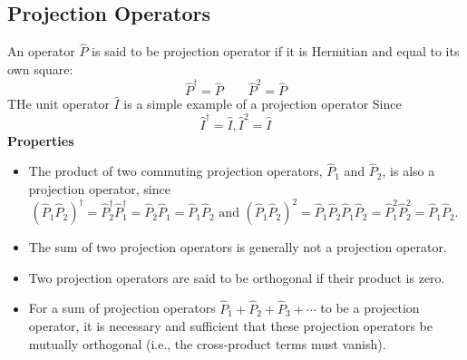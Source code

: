 \subsection{Projection Operators}
An operator $\hat{P}$ is said to be projection operator if it is Hermitian and equal to its own square:\\
$$\hat{P}^{\dagger}=\hat{P} \quad \quad \hat{P}^2=\hat{P}$$
THe unit operator $\hat{I}$ is a simple example of a projection operator Since $$\hat{I}^{\dagger}=\hat{I}, \hat{I}^2=\hat{I}$$
\textbf{Properties}\\
\begin{itemize}
	\item The product of two commuting projection operators, $\hat{P}_{1}$ and $\hat{P}_{2}$, is also a projection operator, since
	$$
	\left(\hat{P}_{1} \hat{P}_{2}\right)^{\dagger}=\hat{P}_{2}^{\dagger} \hat{P}_{1}^{\dagger}=\hat{P}_{2} \hat{P}_{1}=\hat{P}_{1} \hat{P}_{2} \text { and }\left(\hat{P}_{1} \hat{P}_{2}\right)^{2}=\hat{P}_{1} \hat{P}_{2} \hat{P}_{1} \hat{P}_{2}=\hat{P}_{1}^{2} \hat{P}_{2}^{2}=\hat{P}_{1} \hat{P}_{2} \text {. }
	$$
	\item  The sum of two projection operators is generally not a projection operator.
	\item  Two projection operators are said to be orthogonal if their product is zero.
	\item For a sum of projection operators $\hat{P}_{1}+\hat{P}_{2}+\hat{P}_{3}+\cdots$ to be a projection operator, it is necessary and sufficient that these projection operators be mutually orthogonal (i.e., the cross-product terms must vanish).
\end{itemize}
